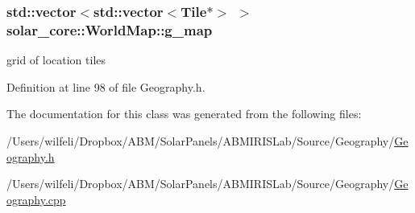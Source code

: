 \subsubsection[{g\+\_\+map}]{\setlength{\rightskip}{0pt plus 5cm}std\+::vector$<$std\+::vector$<${\bf Tile}$\ast$$>$ $>$ solar\+\_\+core\+::\+World\+Map\+::g\+\_\+map}\label{classsolar__core_1_1_world_map_a2b94f74fcea57d3e01d8cab8348e1c48}
grid of location tiles 

Definition at line 98 of file Geography.\+h.



The documentation for this class was generated from the following files\+:\begin{DoxyCompactItemize}
\item 
/\+Users/wilfeli/\+Dropbox/\+A\+B\+M/\+Solar\+Panels/\+A\+B\+M\+I\+R\+I\+S\+Lab/\+Source/\+Geography/\hyperlink{_geography_8h}{Geography.\+h}\item 
/\+Users/wilfeli/\+Dropbox/\+A\+B\+M/\+Solar\+Panels/\+A\+B\+M\+I\+R\+I\+S\+Lab/\+Source/\+Geography/\hyperlink{_geography_8cpp}{Geography.\+cpp}\end{DoxyCompactItemize}

